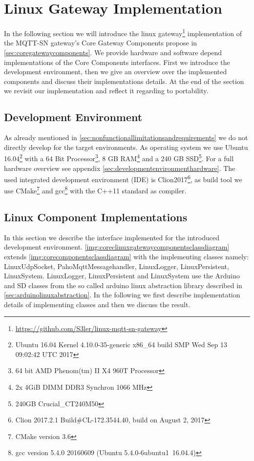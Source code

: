 \section{Linux Gateway Implementation}\label{sec:linuxgatewayimplementation}
In the following section we will introduce the linux gateway\footnote{\url{https://github.com/S3ler/linux-mqtt-sn-gateway}} implementation of the MQTT-SN gateway's Core Gateway Components propose in \autoref{sec:coregatewaycomponents}.
We provide hardware and software depend implementations of the Core Components interfaces.
First we introduce the development environment, then we give an overview over the implemented components and discuss their implementations details.
At the end of the section we revisit our implementation and reflect it regarding to portability.

\subsection{Development Environment}\label{sec:developmentenvironment}
As already mentioned in \autoref{sec:nonfunctionallimitationsandrequirements} we do not directly develop for the target environments.
As operating system we use Ubuntu 16.04\footnote{Ubuntu 16.04 Kernel 4.10.0-35-generic x86\_64 build SMP Wed Sep 13 09:02:42 UTC 2017} with a 64 Bit Processor\footnote{64 bit AMD Phenom(tm) II X4 960T Processor}, 8 GB RAM\footnote{2x 4GiB DIMM DDR3 Synchron 1066 MHz} and a 240 GB SSD\footnote{240GB Crucial\_CT240M50}.
For a full hardware overview see appendix \autoref{sec:developmentenvironmenthardware}.
The used integrated development environment (IDE) is Clion2017\footnote{Clion 2017.2.1 Build\#CL-172.3544.40, build on August 2, 2017}, as build tool we use CMake\footnote{CMake version 3.6} and gcc\footnote{gcc version 5.4.0 20160609 (Ubuntu 5.4.0-6ubuntu1~16.04.4)} with the C++11 standard\cite{ISO:2012:III} as compiler.

\subsection{Linux Component Implementations}\label{sec:linxcomponentimplementations}
In this section we describe the interface implemented for the introduced development environment. \autoref{img:coreclinuxgatewaycomponentsclassdiagram}
extends \autoref{img:corecomponentsclassdiagram} with the implementing classes namely: LinuxUdpSocket, PahoMqttMessagehandler, LinuxLogger, LinuxPersistent, LinuxSystem.
LinuxLogger, LinuxPersistent and LinuxSystem use the Arduino and SD classes from the so called arduino linux abstraction library described in \autoref{sec:arduinolinuxabstraction}.
In the following we first describe implementation details of implementing classes and then we discuss the result.


